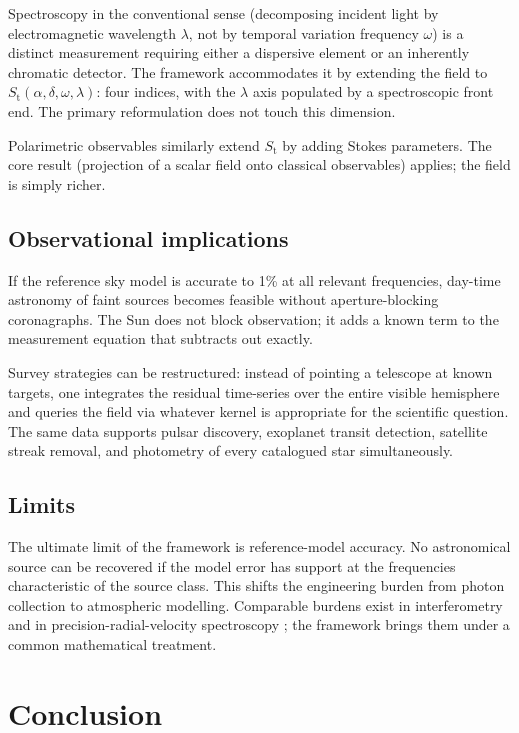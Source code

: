 \documentclass[11pt,twocolumn,a4paper]{article}
\theoremstyle{definition}
\theoremstyle{remark}
\newcommand{\Sfield}{S_{\mathrm{t}}}
\newcommand{\RA}{\alpha}
\newcommand{\Dec}{\delta}
\begin{document}
Spectroscopy in the conventional sense (decomposing incident light by
electromagnetic wavelength $\lambda$, not by temporal variation
frequency $\omega$) is a distinct measurement requiring either a
dispersive element or an inherently chromatic detector. The framework
accommodates it by extending the field to
$\Sfield(\RA, \Dec, \omega, \lambda)$: four indices, with the
$\lambda$ axis populated by a spectroscopic front end. The primary
reformulation does not touch this dimension.

Polarimetric observables similarly extend $\Sfield$ by adding Stokes
parameters. The core result (projection of a scalar field onto
classical observables) applies; the field is simply richer.

\subsection{Observational implications}

If the reference sky model is accurate to 1\% at all relevant
frequencies, day-time astronomy of faint sources becomes feasible
without aperture-blocking coronagraphs. The Sun does not block
observation; it adds a known term to the measurement equation that
subtracts out exactly.

Survey strategies can be restructured: instead of pointing a telescope
at known targets, one integrates the residual time-series over the
entire visible hemisphere and queries the field via whatever kernel
is appropriate for the scientific question. The same data supports
pulsar discovery, exoplanet transit detection, satellite streak
removal, and photometry of every catalogued star simultaneously.

\subsection{Limits}

The ultimate limit of the framework is reference-model accuracy. No
astronomical source can be recovered if the model error has support
at the frequencies characteristic of the source class. This shifts
the engineering burden from photon collection to atmospheric
modelling. Comparable burdens exist in interferometry
\citep{thompson2017} and in precision-radial-velocity spectroscopy
\citep{fischer2016}; the framework brings them under a common
mathematical treatment.

\section{Conclusion}
\label{sec:conclusion}
\end{document}
